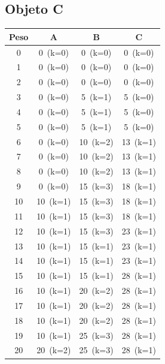 \documentclass[12pt]{article}
\begin{document}
\begin{landscape}
\subsection*{Objeto C}
\begin{longtable}{cccc}
\toprule
Peso & A & B & C \\
\midrule
0 & \cellcolor{red!20}0~(k=0) & \cellcolor{red!20}0~(k=0) & \cellcolor{red!20}0~(k=0) \\
1 & \cellcolor{red!20}0~(k=0) & \cellcolor{red!20}0~(k=0) & \cellcolor{red!20}0~(k=0) \\
2 & \cellcolor{red!20}0~(k=0) & \cellcolor{red!20}0~(k=0) & \cellcolor{red!20}0~(k=0) \\
3 & \cellcolor{red!20}0~(k=0) & \cellcolor{green!40}5~(k=1) & \cellcolor{red!20}5~(k=0) \\
4 & \cellcolor{red!20}0~(k=0) & \cellcolor{green!40}5~(k=1) & \cellcolor{red!20}5~(k=0) \\
5 & \cellcolor{red!20}0~(k=0) & \cellcolor{green!40}5~(k=1) & \cellcolor{red!20}5~(k=0) \\
6 & \cellcolor{red!20}0~(k=0) & \cellcolor{green!40}10~(k=2) & \cellcolor{green!40}13~(k=1) \\
7 & \cellcolor{red!20}0~(k=0) & \cellcolor{green!40}10~(k=2) & \cellcolor{green!40}13~(k=1) \\
8 & \cellcolor{red!20}0~(k=0) & \cellcolor{green!40}10~(k=2) & \cellcolor{green!40}13~(k=1) \\
9 & \cellcolor{red!20}0~(k=0) & \cellcolor{green!40}15~(k=3) & \cellcolor{green!40}18~(k=1) \\
10 & \cellcolor{green!40}10~(k=1) & \cellcolor{green!40}15~(k=3) & \cellcolor{green!40}18~(k=1) \\
11 & \cellcolor{green!40}10~(k=1) & \cellcolor{green!40}15~(k=3) & \cellcolor{green!40}18~(k=1) \\
12 & \cellcolor{green!40}10~(k=1) & \cellcolor{green!40}15~(k=3) & \cellcolor{green!40}23~(k=1) \\
13 & \cellcolor{green!40}10~(k=1) & \cellcolor{yellow!50}15~(k=1) & \cellcolor{green!40}23~(k=1) \\
14 & \cellcolor{green!40}10~(k=1) & \cellcolor{yellow!50}15~(k=1) & \cellcolor{green!40}23~(k=1) \\
15 & \cellcolor{green!40}10~(k=1) & \cellcolor{yellow!50}15~(k=1) & \cellcolor{green!40}28~(k=1) \\
16 & \cellcolor{green!40}10~(k=1) & \cellcolor{green!40}20~(k=2) & \cellcolor{green!40}28~(k=1) \\
17 & \cellcolor{green!40}10~(k=1) & \cellcolor{green!40}20~(k=2) & \cellcolor{green!40}28~(k=1) \\
18 & \cellcolor{green!40}10~(k=1) & \cellcolor{green!40}20~(k=2) & \cellcolor{green!40}28~(k=1) \\
19 & \cellcolor{green!40}10~(k=1) & \cellcolor{green!40}25~(k=3) & \cellcolor{green!40}28~(k=1) \\
20 & \cellcolor{green!40}20~(k=2) & \cellcolor{green!40}25~(k=3) & \cellcolor{green!40}28~(k=1) \\
\bottomrule
\end{longtable}
\end{landscape}
\end{document}
